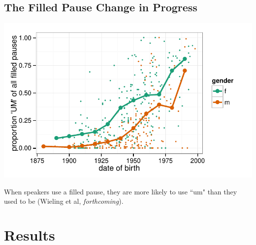 \documentclass[a0,portrait]{a0poster}
\begin{document}
\begin{multicols}{2}
\subsection*{The Filled Pause Change in Progress}
\begin{minipage}[c]{0.70\linewidth}
\includegraphics[width=1\linewidth]{um.pdf}
\end{minipage}
%
\begin{minipage}[c]{0.25\linewidth}
\large
When speakers use a filled pause, they are more likely to use ``um" than they used to be  (Wieling et al, \textsl{forthcoming}).
\end{minipage}






\section*{Results}


\end{multicols}
\end{document}
